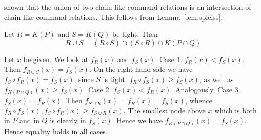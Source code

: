 shown that the union of two chain like command
relations is an intersection of chain like command relations.
This follows from Lemma~\ref{lem:spleiss}.
\proofend
\begin{lem}
Let $R = K(P)$ and $S = K(Q)$ be tight. Then
\begin{equation}
R \cup S = (R \circ S) \cap (S \circ R) \cap K(P \cap Q)
\end{equation}
\end{lem}
\proofbeg
Let $x$ be given. We look at $f_R(x) $ and $f_S(x)$.
Case 1. $f_R(x) < f_S(x)$. Then $f_{R \cup S}(x) = f_S(x)$.
On the right hand side we have $f_S \circ f_R(x) = f_S(x)$,
since $S$ is tight. $f_R \circ f_S(x) \geq f_S(x)$, as well as
$f_{K(P \cap Q)}(x) \geq f_S(x)$. Case 2.  $f_S(x) < f_R(x)$.
Analogously. Case 3. $f_S(x) = f_R(x)$. Then $f_{S \cup R}(x) %
= f_R(x) = f_S(x)$, whence $f_R \circ f_S(x), f_S \circ f_R(x) %
\geq f_{S \cup R}(x)$. The smallest node above $x$ which is
both in $P$ and in $Q$ is clearly in $f_S(x)$. Hence we have
$f_{K(P\cap Q)}(x) = f_S(x)$. Hence equality holds in all
cases.
\proofend

